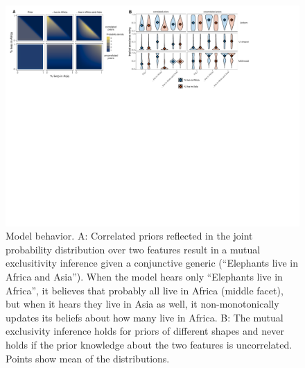 \documentclass[10pt,letterpaper]{article}
\begin{document}
\begin{figure}[t]
  \centering
    \includegraphics[width=1\textwidth]{model}
  \caption{Model behavior. A: Correlated priors reflected in the joint probability distribution over two features result in a mutual exclusitivity inference given a conjunctive generic (``Elephants live in Africa and Asia''). When the model hears only ``Elephants live in Africa'', it believes that probably all live in Africa (middle facet), but when it hears they live in Asia as well, it non-monotonically updates its beliefs about how many live in Africa. B: The mutual exclusivity inference holds for priors of different shapes and never holds if the prior knowledge about the two features is uncorrelated. Points show mean of the distributions.
  }
  \label{fig:model}
\end{figure}
\end{document}
